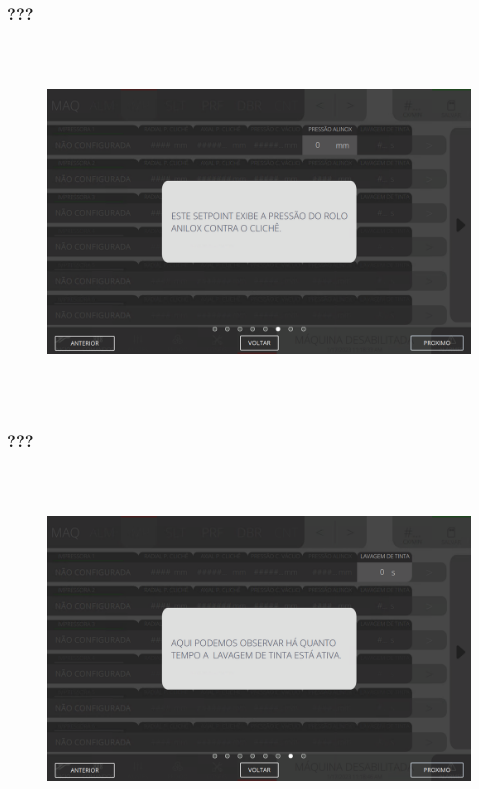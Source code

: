 \newpage
\thispagestyle{fancy}
\vspace*{\fill}
\subsubsection{\small{???}}
\begin{figure}[h]
  \centering
  \includegraphics[width=576px,height=360px]{src/imagesFlexo/04-printter/01-printters/settings/e-6.png}
   \label{}
\end{figure}
\vspace*{\fill}

\newpage
\thispagestyle{fancy}
\vspace*{\fill}
\subsubsection{\small{???}}
\begin{figure}[h]
  \centering
  \includegraphics[width=576px,height=360px]{src/imagesFlexo/04-printter/01-printters/settings/e-7.png}
   \label{}
\end{figure}
\vspace*{\fill}

